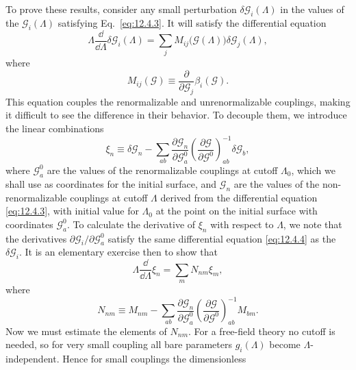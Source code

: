 To prove these results, consider any small perturbation $\delta\mathcal
G_i(\Lambda)$ in the values of the $\mathcal G_i(\Lambda)$ satisfying
Eq.~\eqref{eq:12.4.3}. It will satisfy the differential equation
\begin{equation}
\Lambda\frac{\dd}{\dd\Lambda}\delta\mathcal G_i(\Lambda)
=\sum_j M_{ij}\bigl(\mathcal G(\Lambda)\bigr)\delta\mathcal G_j(\Lambda),
\tag{12.4.4}\label{eq:12.4.4}
\end{equation}
where
\begin{equation}
M_{ij}(\mathcal G)\equiv\frac{\partial}{\partial\mathcal G_j}\beta_i(\mathcal G).
\tag{12.4.5}\label{eq:12.4.5}
\end{equation}
This equation couples the renormalizable and unrenormalizable couplings, making
it difficult to see the difference in their behavior. To decouple them, we
introduce the linear combinations
\begin{equation}
\xi_n\equiv\delta\mathcal G_n-
\sum_{ab}\frac{\partial\mathcal G_n}{\partial\mathcal G_a^0}
\left(\frac{\partial\mathcal G}{\partial\mathcal G^0}\right)^{-1}_{ab}
\delta\mathcal G_b,
\tag{12.4.6}\label{eq:12.4.6}
\end{equation}
where $\mathcal G_a^0$ are the values of the renormalizable couplings at cutoff
$\Lambda_0$, which we shall use as coordinates for the initial surface, and
$\mathcal G_n$ are the values of the non-renormalizable couplings at cutoff
$\Lambda$ derived from the differential equation \eqref{eq:12.4.3}, with
initial value for $\Lambda_0$ at the point on the initial surface with
coordinates $\mathcal G_a^0$. To calculate the derivative of $\xi_n$ with
respect to $\Lambda$, we note that the derivatives
$\partial\mathcal G_i/\partial\mathcal G_a^0$ satisfy the same differential
equation \eqref{eq:12.4.4} as the $\delta\mathcal G_i$. It is an elementary
exercise then to show that
\begin{equation}
\Lambda\frac{\dd}{\dd\Lambda}\xi_n=\sum_m N_{nm}\xi_m,
\tag{12.4.7}\label{eq:12.4.7}
\end{equation}
where
\begin{equation}
N_{nm}\equiv M_{nm}-\sum_{ab}
\frac{\partial\mathcal G_n}{\partial\mathcal G_a^0}
\left(\frac{\partial\mathcal G}{\partial\mathcal G^0}\right)^{-1}_{ab}M_{bm}.
\tag{12.4.8}\label{eq:12.4.8}
\end{equation}
Now we must estimate the elements of $N_{nm}$. For a free-field theory no
cutoff is needed, so for very small coupling all bare parameters $g_i(\Lambda)$
become $\Lambda$-independent. Hence for small couplings the dimensionless
